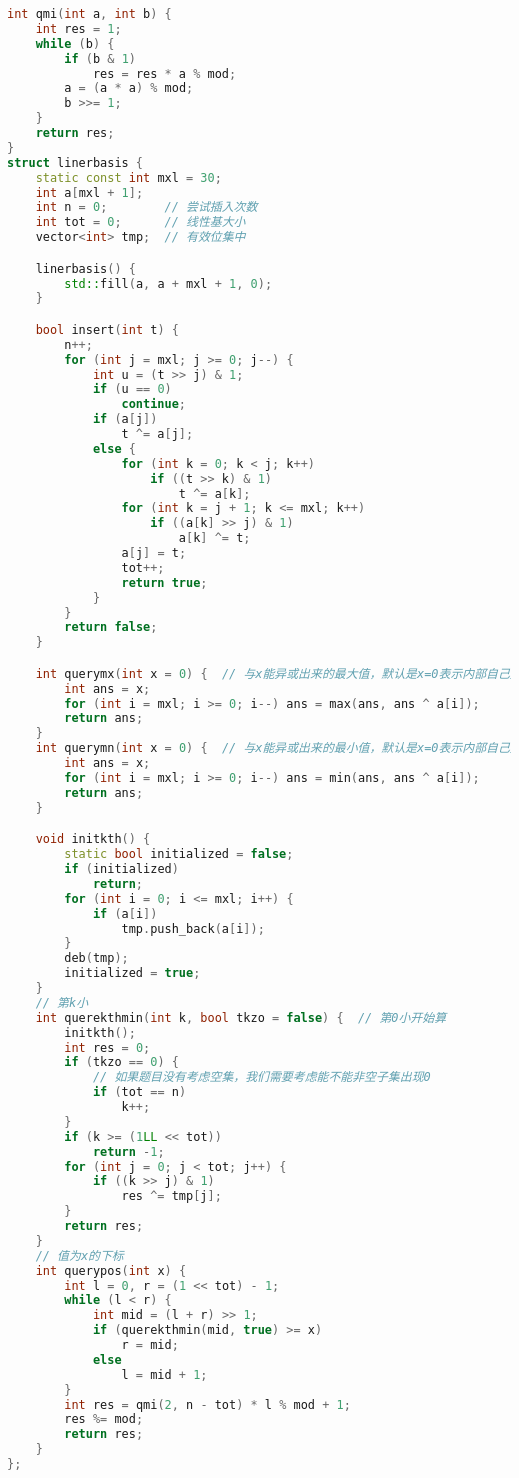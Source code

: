 \begin{lstlisting}[language=C++]
int qmi(int a, int b) {
    int res = 1;
    while (b) {
        if (b & 1)
            res = res * a % mod;
        a = (a * a) % mod;
        b >>= 1;
    }
    return res;
}
struct linerbasis {
    static const int mxl = 30;
    int a[mxl + 1];
    int n = 0;        // 尝试插入次数
    int tot = 0;      // 线性基大小
    vector<int> tmp;  // 有效位集中

    linerbasis() {
        std::fill(a, a + mxl + 1, 0);
    }

    bool insert(int t) {
        n++;
        for (int j = mxl; j >= 0; j--) {
            int u = (t >> j) & 1;
            if (u == 0)
                continue;
            if (a[j])
                t ^= a[j];
            else {
                for (int k = 0; k < j; k++)
                    if ((t >> k) & 1)
                        t ^= a[k];
                for (int k = j + 1; k <= mxl; k++)
                    if ((a[k] >> j) & 1)
                        a[k] ^= t;
                a[j] = t;
                tot++;
                return true;
            }
        }
        return false;
    }

    int querymx(int x = 0) {  // 与x能异或出来的最大值，默认是x=0表示内部自己异或的最大值
        int ans = x;
        for (int i = mxl; i >= 0; i--) ans = max(ans, ans ^ a[i]);
        return ans;
    }
    int querymn(int x = 0) {  // 与x能异或出来的最小值，默认是x=0表示内部自己异或的最小值
        int ans = x;
        for (int i = mxl; i >= 0; i--) ans = min(ans, ans ^ a[i]);
        return ans;
    }

    void initkth() {
        static bool initialized = false;
        if (initialized)
            return;
        for (int i = 0; i <= mxl; i++) {
            if (a[i])
                tmp.push_back(a[i]);
        }
        deb(tmp);
        initialized = true;
    }
    // 第k小
    int querekthmin(int k, bool tkzo = false) {  // 第0小开始算
        initkth();
        int res = 0;
        if (tkzo == 0) {
            // 如果题目没有考虑空集，我们需要考虑能不能非空子集出现0
            if (tot == n)
                k++;
        }
        if (k >= (1LL << tot))
            return -1;
        for (int j = 0; j < tot; j++) {
            if ((k >> j) & 1)
                res ^= tmp[j];
        }
        return res;
    }
    // 值为x的下标
    int querypos(int x) {
        int l = 0, r = (1 << tot) - 1;
        while (l < r) {
            int mid = (l + r) >> 1;
            if (querekthmin(mid, true) >= x)
                r = mid;
            else
                l = mid + 1;
        }
        int res = qmi(2, n - tot) * l % mod + 1;
        res %= mod;
        return res;
    }
};
\end{lstlisting}
